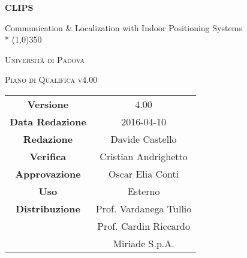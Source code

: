 \documentclass[a4paper,12pt]{article}
\author{Andrighetto Cristian, Castello Davide}
\date{27/12/2015}
\begin{document}
	\begin{titlepage}
		\centering
	{\huge\bfseries CLIPS\par}
	Communication \& Localization with Indoor Positioning Systems \\*
	\line(1,0){350} \\
	{\scshape\LARGE Università di Padova \par}
	\vspace{1cm}
	{\scshape\Large Piano di Qualifica v4.00 \par}
	\logo
	\newpage
		\begin{tabular}{c|c}
			{\hfill \textbf{Versione}} 			& 4.00 				\\
			{\hfill\textbf{Data Redazione}} 		& 2016-04-10	 		\\ 
			{\hfill\textbf{Redazione}} 			& Davide Castello 		\\ 
			{\hfill\textbf{Verifica}} 			& Cristian Andrighetto 		\\
			{\hfill\textbf{Approvazione}} 			& Oscar Elia Conti 		\\
			{\hfill\textbf{Uso}} 				& Esterno			\\
			{\hfill\textbf{Distribuzione}} 			& Prof. Vardanega Tullio	\\
									& Prof. Cardin Riccardo 	\\
									& Miriade S.p.A.
		\end{tabular}
	\end{titlepage}
	
	\newpage
	\pagestyle{myfront}
		
	
	\newpage
		\tableofcontents
	
	\newpage
		\listoftables
	
	\label{LastFrontPage}
	\newpage
		\pagestyle{mymain}
		
	\newpage
		
	\newpage
		
	\newpage
		
	\newpage
		
	\newpage
		
	\newpage
		
	
	\newpage
		
	
	\newpage
		
	
	\newpage
		
	
	\newpage
		
	
	\newpage
		
		
\label{LastPage}
\end{document}

